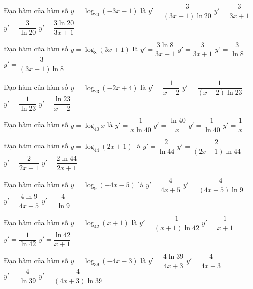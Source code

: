 \documentclass[12pt,a4paper]{article}
\begin{document}
\begin{ex}
Đạo hàm của hàm số $y=\log_{20}(-3x-1)$ là
\choice
{\True $y'=\dfrac{3}{(3x+1)\ln 20}$}
{$y'=\dfrac{3}{3x+1}$}
{$y'=\dfrac{3}{\ln{20}}$}
{$y'=\dfrac{3\ln{20}}{3x+1}$}
\end{ex}
\begin{ex}
Đạo hàm của hàm số $y=\log_8(3x+1)$ là
\choice
{$y'=\dfrac{3\ln{8}}{3x+1}$}
{$y'=\dfrac{3}{3x+1}$}
{$y'=\dfrac{3}{\ln{8}}$}
{\True $y'=\dfrac{3}{(3x+1)\ln 8}$}
\end{ex}
\begin{ex}
Đạo hàm của hàm số $y=\log_{23}(-2x+4)$ là
\choice
{$y'=\dfrac{1}{x-2}$}
{\True $y'=\dfrac{1}{(x-2)\ln 23}$}
{$y'=\dfrac{1}{\ln{23}}$}
{$y'=\dfrac{\ln{23}}{x-2}$}
\end{ex}
\begin{ex}
Đạo hàm của hàm số $y=\log_{40}x$ là
\choice
{\True $y'=\dfrac{1}{x\ln 40}$}
{$y'=\dfrac{\ln{40}}{x}$}
{$y'=\dfrac{1}{\ln{40}}$}
{$y'=\dfrac{1}{x}$}
\end{ex}
\begin{ex}
Đạo hàm của hàm số $y=\log_{44}(2x+1)$ là
\choice
{$y'=\dfrac{2}{\ln{44}}$}
{\True $y'=\dfrac{2}{(2x+1)\ln 44}$}
{$y'=\dfrac{2}{2x+1}$}
{$y'=\dfrac{2\ln{44}}{2x+1}$}
\end{ex}
\begin{ex}
Đạo hàm của hàm số $y=\log_9(-4x-5)$ là
\choice
{$y'=\dfrac{4}{4x+5}$}
{\True $y'=\dfrac{4}{(4x+5)\ln 9}$}
{$y'=\dfrac{4\ln{9}}{4x+5}$}
{$y'=\dfrac{4}{\ln{9}}$}
\end{ex}
\begin{ex}
Đạo hàm của hàm số $y=\log_{42}(x+1)$ là
\choice
{\True $y'=\dfrac{1}{(x+1)\ln 42}$}
{$y'=\dfrac{1}{x+1}$}
{$y'=\dfrac{1}{\ln{42}}$}
{$y'=\dfrac{\ln{42}}{x+1}$}
\end{ex}
\begin{ex}
Đạo hàm của hàm số $y=\log_{39}(-4x-3)$ là
\choice
{$y'=\dfrac{4\ln{39}}{4x+3}$}
{$y'=\dfrac{4}{4x+3}$}
{$y'=\dfrac{4}{\ln{39}}$}
{\True $y'=\dfrac{4}{(4x+3)\ln 39}$}
\end{ex}
\end{document}
